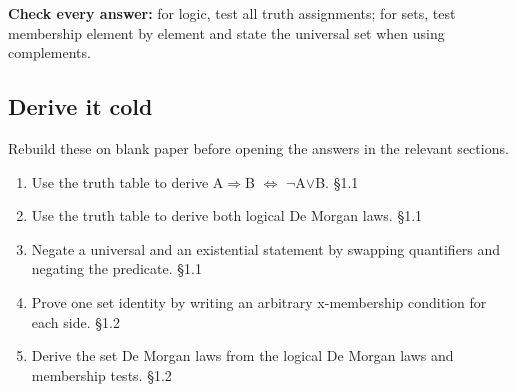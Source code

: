\documentclass[11pt]{article}
\begin{document}
\begin{keepsection}
\begin{notebox}\textbf{Check every answer:} for logic, test all truth assignments; for sets, test membership element by element and state the universal set when using complements.\end{notebox}
\end{keepsection}

\begin{keepsection}
\section{Derive it cold}

Rebuild these on blank paper before opening the answers in the relevant sections.

\begin{enumerate}
\item Use the truth table to derive A\ensuremath{\Rightarrow}B \ensuremath{\Leftrightarrow} \ensuremath{\neg}A\ensuremath{\lor}B. \hfill{\small\color{FAUblue}§1.1}
\item Use the truth table to derive both logical De Morgan laws. \hfill{\small\color{FAUblue}§1.1}
\item Negate a universal and an existential statement by swapping quantifiers and negating the predicate. \hfill{\small\color{FAUblue}§1.1}
\item Prove one set identity by writing an arbitrary x-membership condition for each side. \hfill{\small\color{FAUblue}§1.2}
\item Derive the set De Morgan laws from the logical De Morgan laws and membership tests. \hfill{\small\color{FAUblue}§1.2}
\end{enumerate}
\end{keepsection}
\end{document}
